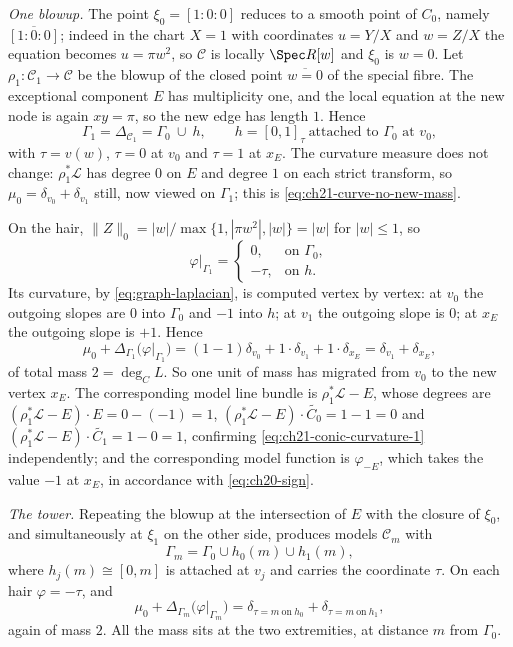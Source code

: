 \begin{example}
\emph{One blowup.}  The point $\xi_0=[1:0:0]$ reduces to a smooth point
of $C_0$, namely $\overline{[1:0:0]}$; indeed in the chart $X=1$ with
coordinates $u=Y/X$ and $w=Z/X$ the equation becomes $u=\pi w^2$, so
$\mathcal C$ is locally $\Spec R[w]$ and $\xi_0$ is $w=0$.  Let
$\rho_1:\mathcal C_1\to\mathcal C$ be the blowup of the closed point
$\overline{w=0}$ of the special fibre.  The exceptional component $E$ has
multiplicity one, and the local equation at the new node is again
$xy=\pi$, so the new edge has length $1$.  Hence
\[
 \Gamma_1=\Delta_{\mathcal C_1}=\Gamma_0\ \cup\ h,
 \qquad h=[0,1]_\tau\ \text{attached to }\Gamma_0\text{ at }v_0,
\]
with $\tau=v(w)$, $\tau=0$ at $v_0$ and $\tau=1$ at $x_E$.  The
curvature measure does not change: $\rho_1^*\mathcal L$ has degree $0$
on $E$ and degree $1$ on each strict transform, so
$\mu_0=\delta_{v_0}+\delta_{v_1}$ still, now viewed on $\Gamma_1$; this
is \eqref{eq:ch21-curve-no-new-mass}.

On the hair, $\lVert Z\rVert_0=|w|/\max\{1,|\pi w^2|,|w|\}=|w|$ for
$|w|\leq1$, so
\begin{equation}
\label{eq:ch21-conic-restriction-1}
 \varphi|_{\Gamma_1}=
 \begin{cases}
  0, & \text{on }\Gamma_0,\\
  -\tau, & \text{on }h .
 \end{cases}
\end{equation}
Its curvature, by \eqref{eq:graph-laplacian}, is computed vertex by vertex:
at $v_0$ the outgoing slopes are $0$ into $\Gamma_0$ and $-1$ into
$h$; at $v_1$ the outgoing slope is $0$; at $x_E$ the outgoing slope
is $+1$.  Hence
\begin{equation}
\label{eq:ch21-conic-curvature-1}
 \mu_0+\Delta_{\Gamma_1}\bigl(\varphi|_{\Gamma_1}\bigr)
 =(1-1)\delta_{v_0}+1\cdot\delta_{v_1}+1\cdot\delta_{x_E}
 =\delta_{v_1}+\delta_{x_E},
\end{equation}
of total mass $2=\deg_CL$.  So one unit of mass has migrated from
$v_0$ to the new vertex $x_E$.  The corresponding model line bundle is
$\rho_1^*\mathcal L-E$, whose degrees are
$(\rho_1^*\mathcal L-E)\cdot E=0-(-1)=1$,
$(\rho_1^*\mathcal L-E)\cdot\widetilde{C_0}=1-1=0$ and
$(\rho_1^*\mathcal L-E)\cdot\widetilde{C_1}=1-0=1$, confirming
\eqref{eq:ch21-conic-curvature-1} independently; and the corresponding
model function is $\varphi_{-E}$, which takes the value $-1$ at
$x_E$, in accordance with \eqref{eq:ch20-sign}.

\emph{The tower.}  Repeating the blowup at the intersection of $E$ with
the closure of $\xi_0$, and simultaneously at $\xi_1$ on the other side,
produces models $\mathcal C_m$ with
\[
 \Gamma_m=\Gamma_0\cup h_0(m)\cup h_1(m),
\]
where $h_j(m)\cong[0,m]$ is attached at $v_j$ and carries the
coordinate $\tau$.  On each hair $\varphi=-\tau$, and
\begin{equation}
\label{eq:ch21-conic-curvature-m}
 \mu_0+\Delta_{\Gamma_m}\bigl(\varphi|_{\Gamma_m}\bigr)
 =\delta_{\tau=m\ \text{on}\ h_0}+\delta_{\tau=m\ \text{on}\ h_1},
\end{equation}
again of mass $2$.  All the mass sits at the two extremities, at distance
$m$ from $\Gamma_0$.


\end{example}
